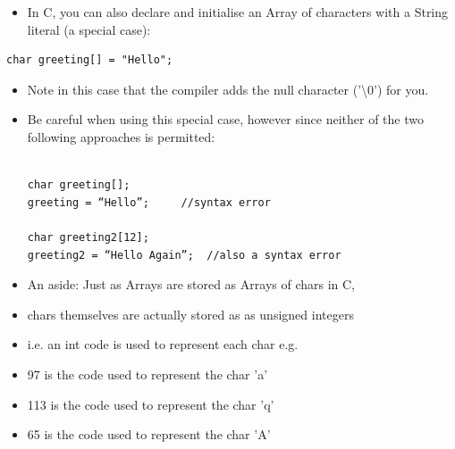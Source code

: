 \documentclass{beamer}
\begin{document}
\begin{frame}[fragile]

\begin{itemize}
\item {\color{black}
In C, you can also declare and initialise an Array of characters with a String literal (a special case):}
\end{itemize}

\begin{block}{}
\begin{lstlisting}
char greeting[] = "Hello";
\end{lstlisting}
\end{block} 

\begin{itemize}
\item {\color{black}
Note in this case that the compiler adds the null character ('{\textbackslash}0') for you.}
\end{itemize}
\end{frame}

\begin{frame}[fragile]
\begin{itemize}

\item {\color{black}
Be careful when using this special case, however since neither of the two following approaches is permitted:}

\begin{block}{}
\begin{lstlisting}

char greeting[];	
greeting = “Hello”;		//syntax error

char greeting2[12];
greeting2 = “Hello Again”;	//also a syntax error

\end{lstlisting}
\end{block}

\end{itemize}
\end{frame}

\begin{frame}
\begin{itemize}
\item An aside: Just as Arrays are stored as Arrays of chars in C,
\item chars themselves are actually stored as as unsigned integers
\item i.e. an int code is used to represent each char e.g.
\item 97 is the code used to represent the char 'a'

\item 113 is the code used to represent the char 'q'
\item 65 is the code used to represent the char 'A'
\end{itemize}
\end{frame}
\end{document}
